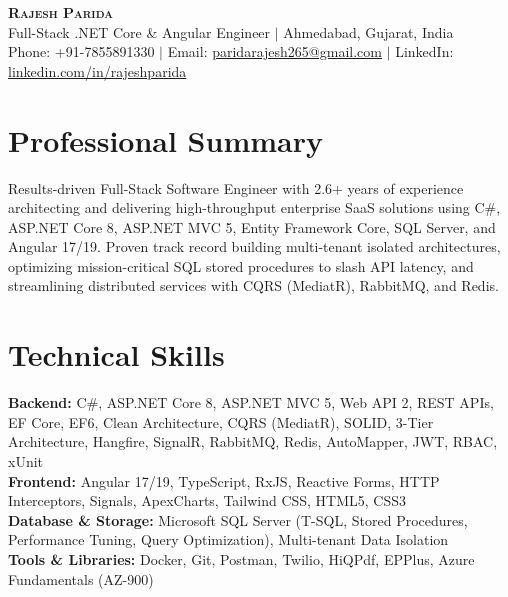 \documentclass[a4paper,10pt]{article}
\begin{document}
\begin{center}
    \textbf{\Huge \scshape Rajesh Parida} \\ \vspace{2pt}
    \small Full-Stack .NET Core \& Angular Engineer $|$ Ahmedabad, Gujarat, India \\ \vspace{1pt}
    \small Phone: +91-7855891330 $|$ Email: \href{mailto:paridarajesh265@gmail.com}{paridarajesh265@gmail.com} $|$ LinkedIn: \href{https://linkedin.com/in/rajeshparida}{linkedin.com/in/rajeshparida}
\end{center}

\section{Professional Summary}
Results-driven Full-Stack Software Engineer with 2.6+ years of experience architecting and delivering high-throughput enterprise SaaS solutions using C\#, ASP.NET Core 8, ASP.NET MVC 5, Entity Framework Core, SQL Server, and Angular 17/19. Proven track record building multi-tenant isolated architectures, optimizing mission-critical SQL stored procedures to slash API latency, and streamlining distributed services with CQRS (MediatR), RabbitMQ, and Redis.

\section{Technical Skills}
\begin{itemize}[leftmargin=0.15in, label={}]
    \small{\item{
     \textbf{Backend:} C\#, ASP.NET Core 8, ASP.NET MVC 5, Web API 2, REST APIs, EF Core, EF6, Clean Architecture, CQRS (MediatR), SOLID, 3-Tier Architecture, Hangfire, SignalR, RabbitMQ, Redis, AutoMapper, JWT, RBAC, xUnit \\
     \textbf{Frontend:} Angular 17/19, TypeScript, RxJS, Reactive Forms, HTTP Interceptors, Signals, ApexCharts, Tailwind CSS, HTML5, CSS3 \\
     \textbf{Database \& Storage:} Microsoft SQL Server (T-SQL, Stored Procedures, Performance Tuning, Query Optimization), Multi-tenant Data Isolation \\
     \textbf{Tools \& Libraries:} Docker, Git, Postman, Twilio, HiQPdf, EPPlus, Azure Fundamentals (AZ-900)
    }}
\end{itemize}
\end{document}
